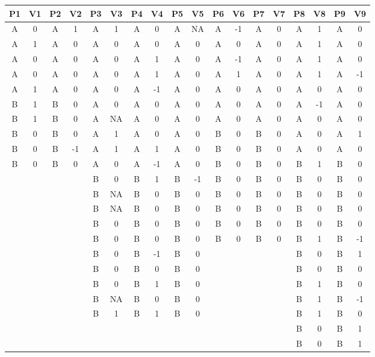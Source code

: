 \documentclass[empirical,issue, twocolumn,authordate]{jote-new-article}
\begin{document}
\begin{table}[t!]
\begin{tabular}{c  c  c  c  c  c  c  c  c  c  c  c  c  c  c  c  c  c}
  P1 & V1 & P2 & V2 & P3 & V3 & P4 & V4 & P5 & V5 & P6 & V6 & P7 & V7
  & P8 & V8 & P9 & V9\\ \midrule
A & 0 & A & 1 & A & 1 & A & 0 & A & NA & A & -1 & A & 0 & A & 1 & A & 0\\
A & 1 & A & 0 & A & 0 & A & 0 & A & 0 & A & 0 & A & 0 & A & 1 & A & 0\\
A & 0 & A & 0 & A & 0 & A & 1 & A & 0 & A & -1 & A & 0 & A & 1 & A & 0\\
A & 0 & A & 0 & A & 0 & A & 1 & A & 0 & A & 1 & A & 0 & A & 1 & A & -1\\
A & 1 & A & 0 & A & 0 & A & -1 & A & 0 & A & 0 & A & 0 & A & 0 & A & 0\\
B & 1 & B & 0 & A & 0 & A & 0 & A & 0 & A & 0 & A & 0 & A & -1 & A & 0\\
B & 1 & B & 0 & A & NA & A & 0 & A & 0 & A & 0 & A & 0 & A & 0 & A & 0\\
B & 0 & B & 0 & A & 1 & A & 0 & A & 0 & B & 0 & B & 0 & A & 0 & A & 1\\
B & 0 & B & -1 & A & 1 & A & 1 & A & 0 & B & 0 & B & 0 & A & 0 & A & 0\\
B & 0 & B & 0 & A & 0 & A & -1 & A & 0 & B & 0 & B & 0 & B & 1 & B & 0\\
  &   &   &   & B & 0 & B & 1 & B & -1 & B & 0 & B & 0 & B & 0 & B & 0\\
  &   &   &   & B & NA & B & 0 & B & 0 & B & 0 & B & 0 & B & 0 & B & 0\\
  &   &   &   & B & NA & B & 0 & B & 0 & B & 0 & B & 0 & B & 0 & B & 0\\
  &   &   &   & B & 0 & B & 0 & B & 0 & B & 0 & B & 0 & B & 0 & B & 0\\
  &   &   &   & B & 0 & B & 0 & B & 0 & B & 0 & B & 0 & B & 1 & B & -1\\
  &   &   &   & B & 0 & B & -1 & B & 0 &   &   &   &   & B & 0 & B & 1\\
  &   &   &   & B & 0 & B & 0 & B & 0 &   &   &   &   & B & 0 & B & 0\\
  &   &   &   & B & 0 & B & 1 & B & 0 &   &   &   &   & B & 1 & B & 0\\
  &   &   &   & B & NA & B & 0 & B & 0 &   &   &   &   & B & 1 & B & -1\\
  &   &   &   & B & 1 & B & 1 & B & 0 &   &   &   &   & B & 1 & B & 0\\
  &   &   &   &   &   &   &   &   &   &   &   &   &   & B & 0 & B & 1\\
  &   &   &   &   &   &   &   &   &   &   &   &   &   & B & 0 & B & 1\\

\end{tabular}
\end{table}
\end{document}
